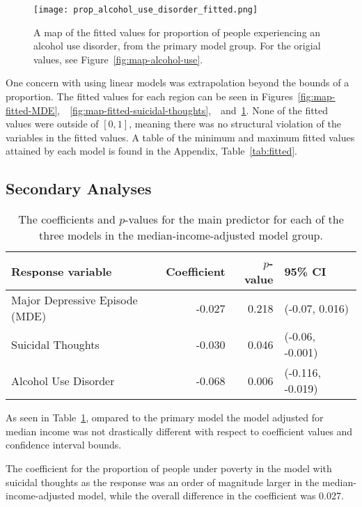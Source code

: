 \documentclass{article}
\begin{document}
\begin{figure}[!htb]
    \centering
    \texttt{[image: prop\_alcohol\_use\_disorder\_fitted.png]}
    \caption{A map of the fitted values for proportion of people experiencing an
    alcohol use disorder, from the primary model group.
    For the origial values, see Figure~\ref{fig:map-alcohol-use}.}
    \label{fig:map-fitted-alcohol-use}
\end{figure}

One concern with using linear models was extrapolation
beyond the bounds of a proportion.
The fitted values for each region can be seen in
Figures~\ref{fig:map-fitted-MDE},\
~\ref{fig:map-fitted-suicidal-thoughts},\
~and~\ref{fig:map-fitted-alcohol-use}.
None of the fitted values were outside of $[0,1]$,
meaning there was no structural violation of the
variables in the fitted values.
A table of the minimum and maximum fitted values
attained by each model is found in the Appendix,
Table~\ref{tab:fitted}.


\subsection{Secondary Analyses}

\begin{table}[!htb]
\begin{center}
\begin{tabular}{l r r l}
    \toprule
    Response variable & Coefficient & $p$-value & 95\% CI\\
    \midrule
    Major Depressive Episode (MDE) & -0.027 & 0.218 & (-0.07, 0.016)\\
    Suicidal Thoughts & -0.030 & 0.046 & (-0.06, -0.001)\\
    Alcohol Use Disorder & -0.068 & 0.006 & (-0.116, -0.019)\\
    \bottomrule
\end{tabular}
\caption{\label{tab:median-income-model-results} The coefficients and $p$-values
    for the main predictor for each of the three models
    in the median-income-adjusted model group.
}
\end{center}
\end{table}

As seen in Table~\ref{tab:median-income-model-results},
ompared to the primary model the model adjusted for median income
was not drastically different with respect to coefficient values and
confidence interval bounds.

The coefficient for the proportion of people under
poverty in the model with suicidal thoughts as the response
was an order of magnitude larger in the median-income-adjusted model,
while the overall difference in the coefficient was 0.027.
\end{document}
